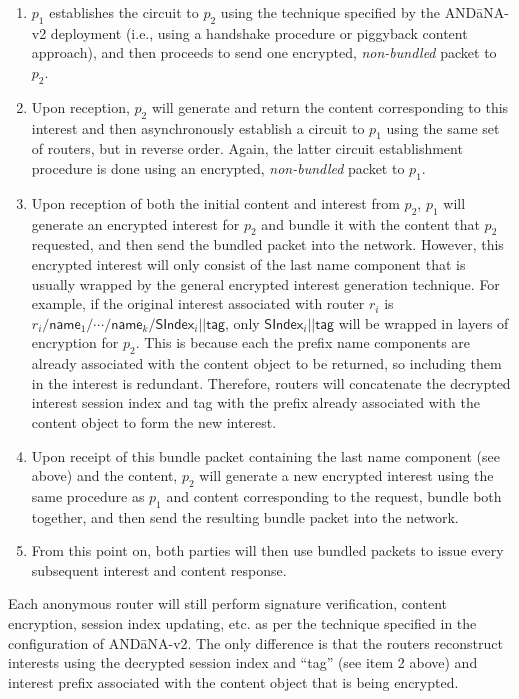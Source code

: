 \documentclass[10pt]{article}
\begin{document}
\begin{enumerate}
  \item $p_1$ establishes the circuit to $p_2$ using the technique specified by the {\sf AND\=aNA-v2} deployment (i.e., using a handshake procedure or piggyback content approach), and then proceeds to send one encrypted, \emph{non-bundled} packet to $p_2$. 
  \item Upon reception, $p_2$ will generate and return the content corresponding to this interest and then asynchronously establish a circuit to $p_1$ using the same set of routers, but in reverse order. Again, the latter circuit establishment procedure is done using an encrypted, \emph{non-bundled} packet to $p_1$.
  \item Upon reception of both the initial content and interest from $p_2$, $p_1$ will generate an encrypted interest for $p_2$ and bundle it with the content that $p_2$ requested, and then send the bundled packet into the network. However, this encrypted interest will only consist of the last name component that is usually wrapped by the general encrypted interest generation technique. For example, if the original interest associated with router $r_i$ is $r_i/\mathsf{name}_1/\cdots/\mathsf{name}_k/\mathsf{SIndex}_i || \mathsf{tag}$, only $\mathsf{SIndex}_i || \mathsf{tag}$ will be wrapped in layers of encryption for $p_2$. This is because each the prefix name components are already associated with the content object to be returned, so including them in the interest is redundant. Therefore, routers will concatenate the decrypted interest session index and tag with the prefix already associated with the content object to form the new interest.
  \item Upon receipt of this bundle packet containing the last name component (see above) and the content, $p_2$ will generate a new encrypted interest using the same procedure as $p_1$ and content corresponding to the request, bundle both together, and then send the resulting bundle packet into the network.
  \item From this point on, both parties will then use bundled packets to issue every subsequent interest and content response.
\end{enumerate}

Each anonymous router will still perform signature verification, content encryption, session index updating, etc. as per the technique specified in the configuration of {\sf AND\=aNA-v2}. The only difference is that the routers reconstruct interests using the decrypted session index and ``tag'' (see item 2 above) and interest prefix associated with the content object that is being encrypted. 
\end{document}
